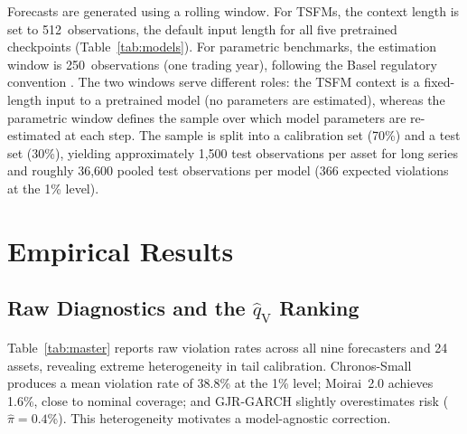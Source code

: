 \documentclass[preprint,11pt,authoryear]{elsarticle}
\newcommand{\1}{\boldsymbol{1}}
\newcommand{\qV}{\hat{q}_{\scriptscriptstyle\mathrm{V}}}
\begin{document}
	Forecasts are generated using a rolling window. For
	TSFMs, the context length is set to 512~observations,
	the default input length for all five pretrained
	checkpoints (Table~\ref{tab:models}). For parametric
	benchmarks, the estimation window is 250~observations
	(one trading year), following the Basel regulatory
	convention
	\citep{basel1996}.
	The two windows serve different roles: the TSFM
	context is a fixed-length input to a pretrained model
	(no parameters are estimated), whereas the parametric
	window defines the sample over which model parameters
	are re-estimated at each step. The sample is split into a calibration set (70\%) and
	a test set (30\%), yielding approximately 1,500 test
	observations per asset for long series and roughly 36,600
	pooled test observations per model (366 expected violations
	at the 1\% level).
	
	\section{Empirical Results}
	\label{sec:results}
	
	\subsection{Raw Diagnostics and the $\qV$ Ranking}
	\label{sec:results_raw}
	\label{sec:diagnostic}
	
	Table~\ref{tab:master} reports raw violation rates across all
	nine forecasters and 24 assets, revealing extreme heterogeneity
	in tail calibration. Chronos-Small produces a mean violation
	rate of 38.8\% at the 1\% level; Moirai~2.0 achieves 1.6\%,
	close to nominal coverage; and GJR-GARCH slightly overestimates
	risk ($\hat\pi = 0.4$\%). This heterogeneity motivates a
	model-agnostic correction.
	
\end{document}
